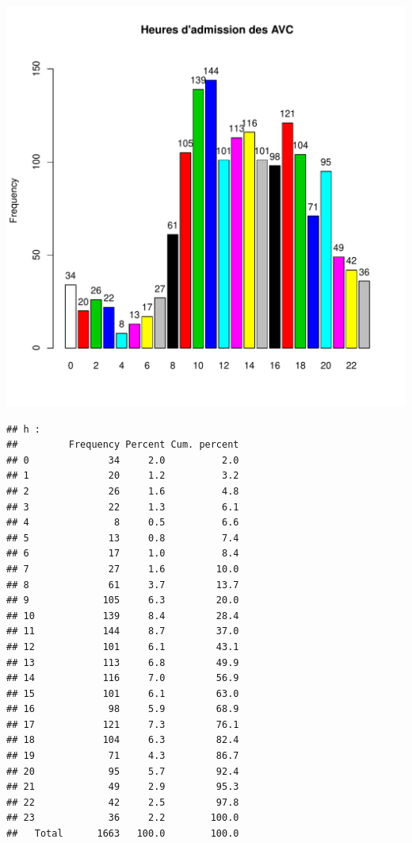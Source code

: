 \documentclass[12pt,english,french,twoside]{report}\usepackage[]{graphicx}\usepackage[]{color}
\makeatletter
\def\maxwidth{ %
  \ifdim\Gin@nat@width>\linewidth
    \linewidth
  \else
    \Gin@nat@width
  \fi
}
\newenvironment{kframe}{%
 \def\at@end@of@kframe{}%
 \ifinner\ifhmode%
  \def\at@end@of@kframe{\end{minipage}}%
  \begin{minipage}{\columnwidth}%
 \fi\fi%
 \def\FrameCommand##1{\hskip\@totalleftmargin \hskip-\fboxsep
 \colorbox{shadecolor}{##1}\hskip-\fboxsep
     \hskip-\linewidth \hskip-\@totalleftmargin \hskip\columnwidth}%
 \MakeFramed {\advance\hsize-\width
   \@totalleftmargin\z@ \linewidth\hsize
   \@setminipage}}%
 {\par\unskip\endMakeFramed%
 \at@end@of@kframe}
\newenvironment{knitrout}{}{} %
\makeatother
\begin{document}
\begin{knitrout}
\includegraphics[width=\maxwidth]{figure/heure_avc2} 
\begin{kframe}\begin{verbatim}
## h :  
##         Frequency Percent Cum. percent
## 0              34     2.0          2.0
## 1              20     1.2          3.2
## 2              26     1.6          4.8
## 3              22     1.3          6.1
## 4               8     0.5          6.6
## 5              13     0.8          7.4
## 6              17     1.0          8.4
## 7              27     1.6         10.0
## 8              61     3.7         13.7
## 9             105     6.3         20.0
## 10            139     8.4         28.4
## 11            144     8.7         37.0
## 12            101     6.1         43.1
## 13            113     6.8         49.9
## 14            116     7.0         56.9
## 15            101     6.1         63.0
## 16             98     5.9         68.9
## 17            121     7.3         76.1
## 18            104     6.3         82.4
## 19             71     4.3         86.7
## 20             95     5.7         92.4
## 21             49     2.9         95.3
## 22             42     2.5         97.8
## 23             36     2.2        100.0
##   Total      1663   100.0        100.0
\end{verbatim}
\end{kframe}
\end{knitrout}
\end{document}
